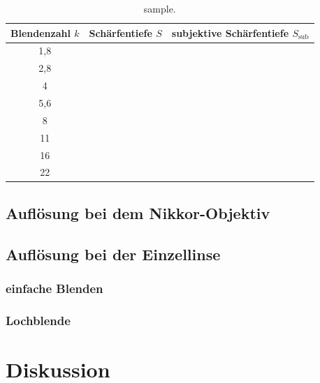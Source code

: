 		\begin{table}[ht]
			\centering
			\begin{tabular}{c|c|c}
				Blendenzahl $k$ & Schärfentiefe $S$ & subjektive Schärfentiefe $S_\text{sub}$ \\
				\hline
				1,8 & & \\
				2,8 & & \\
				4 & & \\
				5,6 & & \\
				8 & & \\
				11 & & \\
				16 & & \\
				22 & & \\
			\end{tabular}
			\caption{sample.}
			\label{tab:Messergebnisse}
		\end{table}
	
	\subsection{Auflösung bei dem Nikkor-Objektiv}
		
		
	\subsection{Auflösung bei der Einzellinse}
	
		\subsubsection{einfache Blenden}
			
			
		\subsubsection{Lochblende}
		
	
		
\section{Diskussion}
	
